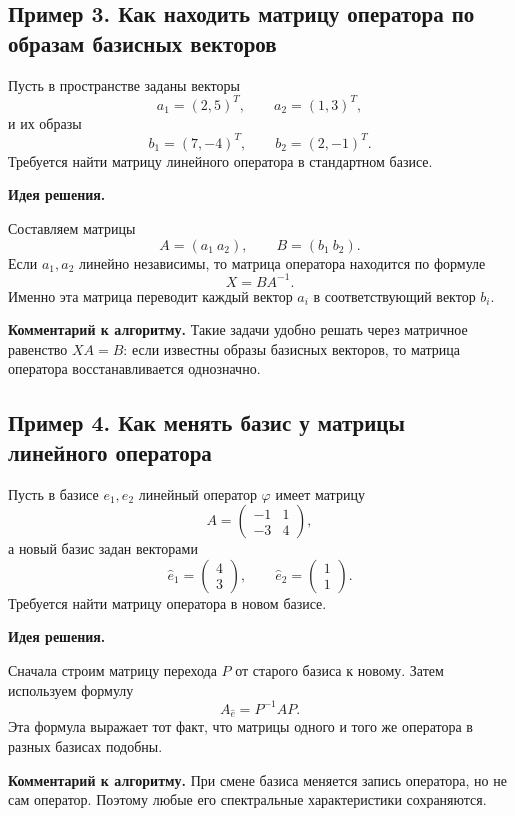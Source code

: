 \subsection*{Пример 3. Как находить матрицу оператора по образам базисных векторов}

Пусть в пространстве заданы векторы
\[
a_1=(2,5)^T,\qquad a_2=(1,3)^T,
\]
и их образы
\[
b_1=(7,-4)^T,\qquad b_2=(2,-1)^T.
\]
Требуется найти матрицу линейного оператора в стандартном базисе.

\textbf{Идея решения.}

Составляем матрицы
\[
A=(a_1\ a_2),\qquad B=(b_1\ b_2).
\]
Если $a_1,a_2$ линейно независимы, то матрица оператора находится по формуле
\[
X=BA^{-1}.
\]
Именно эта матрица переводит каждый вектор $a_i$ в соответствующий вектор $b_i$.

\medskip
\noindent
\textbf{Комментарий к алгоритму.}
Такие задачи удобно решать через матричное равенство $XA=B$: если известны образы базисных векторов, то матрица оператора восстанавливается однозначно.

\subsection*{Пример 4. Как менять базис у матрицы линейного оператора}

Пусть в базисе $e_1,e_2$ линейный оператор $\varphi$ имеет матрицу
\[
A=\begin{pmatrix}
-1 & 1\\
-3 & 4
\end{pmatrix},
\]
а новый базис задан векторами
\[
\hat e_1=\begin{pmatrix}4\\3\end{pmatrix},\qquad
\hat e_2=\begin{pmatrix}1\\1\end{pmatrix}.
\]
Требуется найти матрицу оператора в новом базисе.

\textbf{Идея решения.}

Сначала строим матрицу перехода $P$ от старого базиса к новому. Затем используем формулу
\[
A_{\hat e}=P^{-1}AP.
\]
Эта формула выражает тот факт, что матрицы одного и того же оператора в разных базисах подобны.

\medskip
\noindent
\textbf{Комментарий к алгоритму.}
При смене базиса меняется запись оператора, но не сам оператор. Поэтому любые его спектральные характеристики сохраняются.


